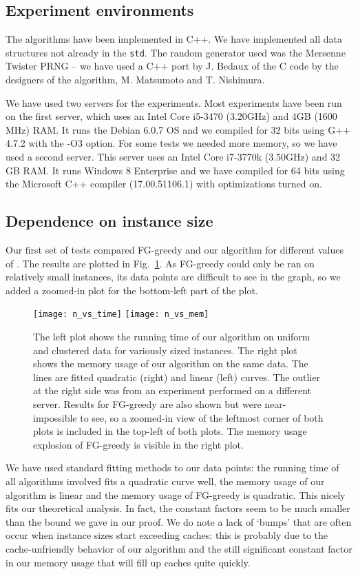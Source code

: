 \documentclass[runningheads,envcountsame,oribibl,orivec]{llncs}
\begin{document}
\subsection{Experiment environments}

The algorithms have been implemented in C++. We have implemented all data structures not already in the \verb|std|. The random generator used was the Mersenne Twister PRNG -- we have used a C++ port by J. Bedaux of the C code by the designers of the algorithm,  M. Matsumoto and T. Nishimura.

We have used two servers for the experiments. Most experiments have been run on the first server, which uses an Intel Core i5-3470 (3.20GHz) and 4GB (1600 MHz) RAM. It runs the Debian 6.0.7 OS and we compiled for 32 bits using G++ 4.7.2 with the -O3 option. For some tests we needed more memory, so we have used a second server. This server uses an Intel Core i7-3770k (3.50GHz) and 32 GB RAM. It runs Windows 8 Enterprise and we have compiled for 64 bits using the Microsoft C++ compiler (17.00.51106.1) with optimizations turned on.

\subsection{Dependence on instance size}

Our first set of tests compared FG-greedy and our algorithm for different values of . The results are plotted in Fig.~\ref{figure:plot}. As FG-greedy could only be ran on relatively small instances, its data points are difficult to see in the graph, so we added a zoomed-in plot for the bottom-left part of the plot.

\begin{figure}[h!]\centering
\texttt{[image: n\_vs\_time]}
\texttt{[image: n\_vs\_mem]}
\caption{The left plot shows the running time of our algorithm on uniform and clustered data for variously sized instances. The right plot shows the memory usage of our algorithm on the same data. The lines are fitted quadratic (right) and linear (left) curves. The outlier at the right side was from an experiment performed on a different server. Results for FG-greedy are also shown but were near-impossible to see, so a zoomed-in view of the leftmost corner of both plots is included in the top-left of both plots. The memory usage explosion of FG-greedy is visible in the right plot.}
\label{figure:plot}
\end{figure}

We have used standard fitting methods to our data points: the running time of all algorithms involved fits a quadratic curve well, the memory usage of our algorithm is linear and the memory usage of FG-greedy is quadratic. This nicely fits our theoretical analysis. In fact, the constant factors seem to be much smaller than the bound we gave in our proof. We do note a lack of `bumps' that are often occur when instance sizes start exceeding caches: this is probably due to the cache-unfriendly behavior of our algorithm and the still significant constant factor in our memory usage that will fill up caches quite quickly.
\end{document}
